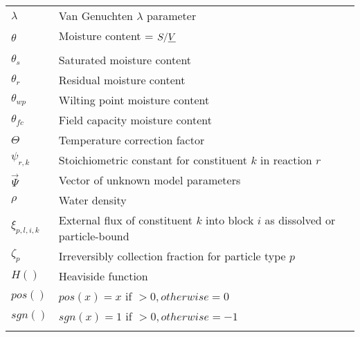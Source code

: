 \begin{longtable}{| p{} | p{} |}
$\lambda$ & Van Genuchten $\lambda$ parameter \\
$\theta$ & Moisture content = $S/\sout{V}$ \\
$\theta_s$ & Saturated moisture content \\
$\theta_r$ & Residual moisture content \\
$\theta_{wp}$ & Wilting point moisture content \\
$\theta_{fc}$ & Field capacity moisture content \\
$\Theta$ & Temperature correction factor \\
$\psi_{r,k}$ & Stoichiometric constant for constituent $k$ in reaction $r$ \\
$\vec{\Psi}$ & Vector of unknown model parameters \\
$\rho$ & Water density \\
$\xi_{p,l,i,k}$ & External flux of constituent $k$ into block $i$ as dissolved or particle-bound \\
$\zeta_p$ & Irreversibly collection fraction for particle type $p$ \\
$H()$ & Heaviside function \\
$pos()$ & $pos(x)=x$ if $>0, otherwise = 0$\\
$sgn()$ & $sgn(x)=1$ if $>0, otherwise = -1$ \\
\label{table:2} %
\end{longtable}